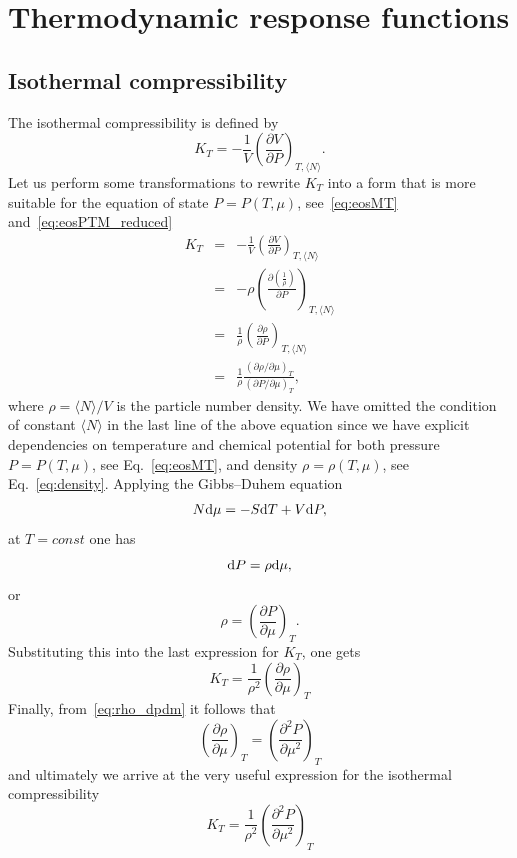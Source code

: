 \documentclass[12pt]{article}
\begin{document}
	\section{\label{sec:respons_functions}Thermodynamic response functions}
	
	\subsection{Isothermal compressibility}
	The isothermal compressibility is defined by
	\begin{equation}
		\label{def:isotherm_compres}
		K_T = -\frac{1}{V}\left(\frac{\partial V}{\partial P}\right)_{T,\langle N\rangle}.
	\end{equation}
	Let us perform some transformations to rewrite $K_T$ into a form that is more suitable for the equation of state $P=P(T,\mu)$, see~\eqref{eq:eosMT} and~\eqref{eq:eosPTM_reduced}
	\begin{eqnarray*}
		K_T & = & - \frac{1}{V}\left(\frac{\partial V}{\partial P}\right)_{T,\langle N\rangle}
		\\
		& = & -\rho \left(\frac{\partial \left(\frac{1}{\rho}\right)}{\partial P}\right)_{T,\langle N\rangle}
		\\
		& = & \frac{1}{\rho} \left(\frac{\partial \rho}{\partial P} \right)_{T,\langle N\rangle}
		\\
		& = & \frac{1}{\rho} \frac{\left(\partial \rho / \partial \mu\right)_{T}}
		{\left(\partial P / \partial \mu\right)_{T}},
	\end{eqnarray*}
	where $\rho = \langle N \rangle / V$ is the particle number density. We have omitted the condition of constant $\langle N \rangle$ in the last line of the above equation since we have explicit dependencies on temperature and chemical potential for both pressure $P = P(T, \mu)$, see Eq.~\eqref{eq:eosMT}, and density $\rho = \rho(T, \mu)$, see Eq.~\eqref{eq:density}.
	Applying the Gibbs--Duhem equation
	\begin{equation}
		N{\rm d}\mu = -S{\rm d}T + V{\rm d}P,
	\end{equation}
	at $T = const$ one has 
	\begin{equation*}
		{\rm d} P = \rho {\rm d} \mu,
	\end{equation*}
	or
	\begin{equation}
		\label{eq:rho_dpdm}
		\rho = \left(\frac{\partial P}{\partial \mu}\right)_T.
	\end{equation}
	Substituting this into the last expression for $K_T$, one gets
	\begin{equation}
		K_T = \frac{1}{\rho^2} \left(\frac{\partial \rho}{\partial \mu}\right)_{T}
	\end{equation}
	Finally, from~\eqref{eq:rho_dpdm} it follows that
	\begin{equation}
		\left(\frac{\partial \rho}{\partial \mu}\right)_T = \left(\frac{\partial^2 P}{\partial \mu^2}\right)_T
	\end{equation}
	and ultimately we arrive at the very useful expression for the isothermal compressibility
	\begin{equation}
		K_T = \frac{1}{\rho^2} \left(\frac{\partial^2 P}{\partial \mu^2}\right)_{T}
	\end{equation}
	
\end{document}
